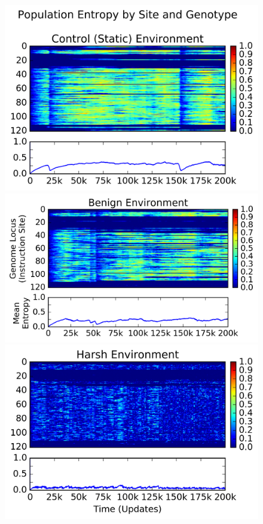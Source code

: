 \documentclass[10pt,letterpaper]{article}
\begin{document}
\begin{figure}[!h]
\includegraphics[trim={-0.85cm 0 0.1cm 0.2cm},clip,width=1\columnwidth]{figures/control__entropy}
\includegraphics[trim={0.25cm 0 0.1cm 0},clip,width=1\columnwidth]{figures/benign__entropy}
\includegraphics[trim={-0.85cm 0 0.1cm 0},clip,width=1\columnwidth]{figures/harsh__entropy}

\end{figure}
\end{document}
